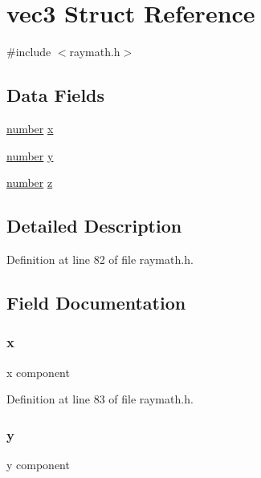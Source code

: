 \hypertarget{structvec3}{}\section{vec3 Struct Reference}
\label{structvec3}


{\ttfamily \#include $<$raymath.\+h$>$}

\subsection*{Data Fields}
\begin{DoxyCompactItemize}
\item 
\hyperlink{raymath_8h_aa97c1f529dc5a11a78758184c84a39c9}{number} \hyperlink{structvec3_a117e8fdc0c12b911e0b4d7cf0e99c897}{x}
\item 
\hyperlink{raymath_8h_aa97c1f529dc5a11a78758184c84a39c9}{number} \hyperlink{structvec3_ae14c17bdf80bbde4381c61ddf63a7d98}{y}
\item 
\hyperlink{raymath_8h_aa97c1f529dc5a11a78758184c84a39c9}{number} \hyperlink{structvec3_ae59474797d4b0b7d7544bde5c6421230}{z}
\end{DoxyCompactItemize}


\subsection{Detailed Description}


Definition at line 82 of file raymath.\+h.



\subsection{Field Documentation}
\subsubsection[{\texorpdfstring{x}{x}}]{ x}\hypertarget{structvec3_a117e8fdc0c12b911e0b4d7cf0e99c897}{}\label{structvec3_a117e8fdc0c12b911e0b4d7cf0e99c897}
x component 

Definition at line 83 of file raymath.\+h.

\subsubsection[{\texorpdfstring{y}{y}}]{ y}\hypertarget{structvec3_ae14c17bdf80bbde4381c61ddf63a7d98}{}\label{structvec3_ae14c17bdf80bbde4381c61ddf63a7d98}
y component 

